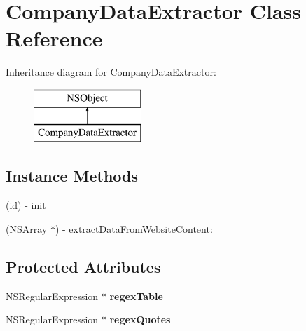 \hypertarget{interface_company_data_extractor}{\section{Company\-Data\-Extractor Class Reference}
\label{interface_company_data_extractor}
}
Inheritance diagram for Company\-Data\-Extractor\-:\begin{figure}[H]
\begin{center}
\leavevmode
\includegraphics[height=2.000000cm]{interface_company_data_extractor}
\end{center}
\end{figure}
\subsection*{Instance Methods}
\begin{DoxyCompactItemize}
\item 
(id) -\/ \hyperlink{interface_company_data_extractor_aa1b23d42cf4b7ba83a5527a92a4393a8}{init}
\item 
(N\-S\-Array $\ast$) -\/ \hyperlink{interface_company_data_extractor_a67ac4215b69559f7a79bb278b3e2924d}{extract\-Data\-From\-Website\-Content\-:}
\end{DoxyCompactItemize}
\subsection*{Protected Attributes}
\begin{DoxyCompactItemize}
\item 
\hypertarget{interface_company_data_extractor_aec1574f5d8d8b33ab6d2c8c69fbfafe6}{N\-S\-Regular\-Expression $\ast$ {\bfseries regex\-Table}}\label{interface_company_data_extractor_aec1574f5d8d8b33ab6d2c8c69fbfafe6}

\item 
\hypertarget{interface_company_data_extractor_aaa2238c9881e4d1484604f77f5db565b}{N\-S\-Regular\-Expression $\ast$ {\bfseries regex\-Quotes}}\label{interface_company_data_extractor_aaa2238c9881e4d1484604f77f5db565b}

\end{DoxyCompactItemize}



